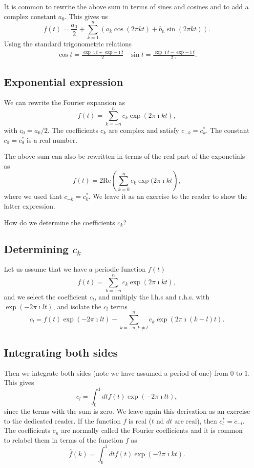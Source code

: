 \documentclass[%
oneside,                 %
final,                   %
10pt]{article}
\begin{document}
It is common to rewrite the above sum in terms of sines and cosines and to add a complex constant $a_0$. This gives us
\[
f(t) = \frac{a_0}{2}+ \sum_{k=1}^{n}\left(a_k\cos{(2\pi kt)}+b_n\sin{(2\pi kt)}\right).
\]
Using the standard trigonometric relations
\begin{align*}
\cos{t} = \frac{\exp{\imath t}+\exp{-\imath t}}{2} & \sin{t} = \frac{\exp{\imath t}-\exp{-\imath t}}{2\imath}.
\end{align*}

\subsection{Exponential expression}

We can rewrite the Fourier expansion as
\[
f(t) =\sum_{k=-n}^{n}c_{k}\exp{(2\pi\imath kt)}, 
\]
with $c_0=a_0/2$. The coefficients $c_k$ are complex and satisfy $c_{-k}=c_k^*$.
The constant $c_{0}=c_0^*$ is a real number.

The above sum can also be rewritten in terms of the real part of the exponetials as
\[
f(t) =2\mathrm{Re}\left(\sum_{k=0}^{n}c_{k}\exp{(2\pi\imath kt} \right),
\]
where we used that $c_{-k}=c_k^*$. We leave it as an exercise to the reader to show the latter expression.

How do we determine the coefficients $c_k$?

\subsection{Determining $c_k$}

Let us assume that we have a periodic function $f(t)$ 
\[
f(t) =\sum_{k=-n}^{n}c_{k}\exp{(2\pi\imath kt)}, 
\]
and we select the coefficient $c_l$, and multiply the l.h.s and r.h.s. with $\exp{(-2\pi\imath lt)}$, and isolate the $c_l$ terms
\[
c_l=f(t)\exp{(-2\pi\imath lt)}-\sum_{k=-n, k\ne l}^{n}c_{k}\exp{(2\pi\imath (k-l)t)}. 
\]
\subsection{Integrating both sides}

Then we integrate both sides (note we have assumed a period of one) from $0$ to $1$. This gives
\[
c_l=\int_0^1 dtf(t)\exp{(-2\pi\imath lt)},
\]
since the terms with the sum is zero.  We leave again this derivation as an exercise to the dedicated reader.
If the function $f$ is real ($t$ nd $dt$ are real), then $c_l^*=c_{-l}$.
The coefficients $c_n$ are normally called the Fourier coefficients and it is common to relabel them in terms of the function $f$ as
\[
\hat{f}(k)=\int_0^1 dt f(t)\exp{(-2\pi\imath kt)}.
\]
\end{document}

